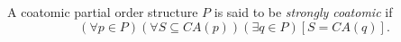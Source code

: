 A coatomic partial order structure $P$ is said to be \emph{strongly coatomic} if
$$(\forall p \in P)(\forall S \subseteq CA(p))(\exists q \in P)[S = CA(q)].$$
